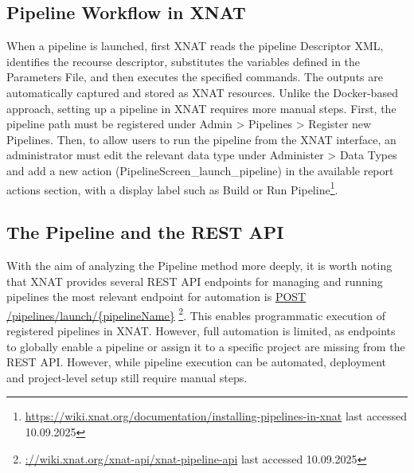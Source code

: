 \subsection{Pipeline Workflow in XNAT}
When a pipeline is launched, first XNAT reads the pipeline Descriptor XML, identifies the recourse descriptor, substitutes the variables defined in the Parameters File, and then executes the specified commands. The outputs are automatically captured and stored as XNAT resources.
Unlike the Docker-based approach, setting up a pipeline in XNAT requires more manual steps. First, the pipeline path must be registered under Admin > Pipelines > Register new Pipelines. Then, to allow users to run the pipeline from the XNAT interface, an administrator must edit the relevant data type under Administer > Data Types and add a new action (PipelineScreen\_launch\_pipeline) in the available report actions section, with a display label such as Build or Run Pipeline\footnote{\url{https://wiki.xnat.org/documentation/installing-pipelines-in-xnat} last accessed 10.09.2025}.
\normalsize



\subsection{The Pipeline and the REST API}
With the aim of analyzing the Pipeline method more deeply, it is worth noting that XNAT provides several REST API endpoints for managing and running pipelines the most relevant endpoint for automation is \url{POST /pipelines/launch/{pipelineName}} \footnote{\url{://wiki.xnat.org/xnat-api/xnat-pipeline-api} last accessed 10.09.2025}.
This enables programmatic execution of registered pipelines in XNAT. However, full automation is limited, as endpoints to globally enable a pipeline or assign it to a specific project are missing from the REST API. However, while pipeline execution can be automated, deployment and project-level setup still require manual steps.



